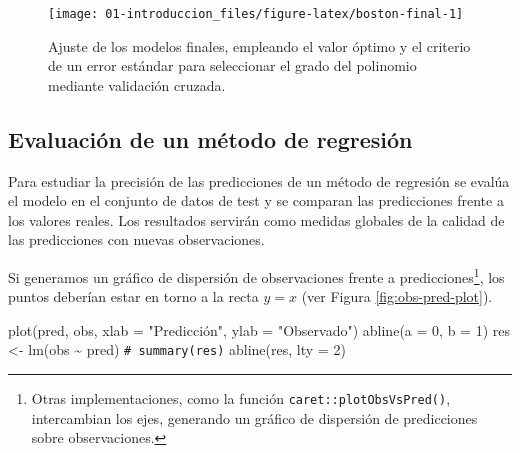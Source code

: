\documentclass[
]{book}
\newenvironment{Shaded}{\begin{snugshade}}{\end{snugshade}}
\newcommand{\AttributeTok}[1]{\textcolor[rgb]{0.77,0.63,0.00}{#1}}
\newcommand{\CommentTok}[1]{\textcolor[rgb]{0.56,0.35,0.01}{\textit{#1}}}
\newcommand{\DecValTok}[1]{\textcolor[rgb]{0.00,0.00,0.81}{#1}}
\newcommand{\FunctionTok}[1]{\textcolor[rgb]{0.00,0.00,0.00}{#1}}
\newcommand{\NormalTok}[1]{#1}
\newcommand{\OtherTok}[1]{\textcolor[rgb]{0.56,0.35,0.01}{#1}}
\newcommand{\SpecialCharTok}[1]{\textcolor[rgb]{0.00,0.00,0.00}{#1}}
\newcommand{\StringTok}[1]{\textcolor[rgb]{0.31,0.60,0.02}{#1}}
\theoremstyle{break}
\theoremstyle{nonumberplain}
\renewcommand{\CommentTok}[1]{\textcolor[rgb]{0.41,0.41,0.41}{\texttt{#1}}}
\begin{document}
\begin{figure}[!htb]

{\centering \texttt{[image: 01-introduccion\_files/figure-latex/boston-final-1]} 

}

\caption{Ajuste de los modelos finales, empleando el valor óptimo y el criterio de un error estándar para seleccionar el grado del polinomio mediante validación cruzada.}\label{fig:boston-final}
\end{figure}

\hypertarget{eval-reg}{%
\subsection{Evaluación de un método de regresión}\label{eval-reg}}

Para estudiar la precisión de las predicciones de un método de regresión se evalúa el modelo en el conjunto de datos de test y se comparan las predicciones frente a los valores reales.
Los resultados servirán como medidas globales de la calidad de las predicciones con nuevas observaciones.

\begin{Shaded}
\end{Shaded}

Si generamos un gráfico de dispersión de observaciones frente a predicciones\footnote{Otras implementaciones, como la función \texttt{caret::plotObsVsPred()}, intercambian los ejes, generando un gráfico de dispersión de predicciones sobre observaciones.}, los puntos deberían estar en torno a la recta \(y=x\) (ver Figura \ref{fig:obs-pred-plot}).

\begin{Shaded}
\begin{Highlighting}[]
\FunctionTok{plot}\NormalTok{(pred, obs, }\AttributeTok{xlab =} \StringTok{"Predicción"}\NormalTok{, }\AttributeTok{ylab =} \StringTok{"Observado"}\NormalTok{)}
\FunctionTok{abline}\NormalTok{(}\AttributeTok{a =} \DecValTok{0}\NormalTok{, }\AttributeTok{b =} \DecValTok{1}\NormalTok{)}
\NormalTok{res }\OtherTok{\textless{}{-}} \FunctionTok{lm}\NormalTok{(obs }\SpecialCharTok{\textasciitilde{}}\NormalTok{ pred)}
\CommentTok{\# summary(res)}
\FunctionTok{abline}\NormalTok{(res, }\AttributeTok{lty =} \DecValTok{2}\NormalTok{)}
\end{Highlighting}
\end{Shaded}
\end{document}
